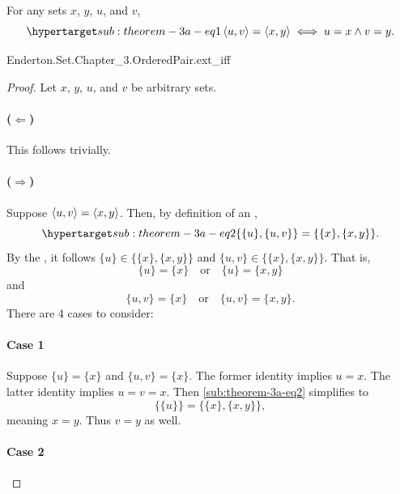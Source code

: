 \documentclass{report}
\begin{document}
  \begin{theorem}[3A]
    For any sets $x$, $y$, $u$, and $v$,
      \begin{equation}
        \hyperlabel{sub:theorem-3a-eq1}
        \tuple{u, v} = \tuple{x, y} \iff u = x \land v = y.
      \end{equation}
  \end{theorem}

    {Enderton.Set.Chapter\_3.OrderedPair.ext\_iff}

  \begin{proof}
    Let $x$, $y$, $u$, and $v$ be arbitrary sets.

    \paragraph{($\Leftarrow$)}%

      This follows trivially.

    \paragraph{($\Rightarrow$)}%

      Suppose $\left< u, v \right> = \left< x, y \right>$.
      Then, by definition of an ,
        \begin{equation}
          \hyperlabel{sub:theorem-3a-eq2}
          \{\{u\}, \{u, v\}\} = \{\{x\}, \{x, y\}\}.
        \end{equation}
      By the , it follows
        $\{u\} \in \{\{x\}, \{x, y\}\}$ and
        $\{u, v\} \in \{\{x\}, \{x, y\}\}$.
      That is,
        $$\{u\} = \{x\} \quad\text{or}\quad \{u\} = \{x, y\}$$
        and
        $$\{u, v\} = \{x\} \quad\text{or}\quad \{u, v\} = \{x, y\}.$$
      There are 4 cases to consider:

      \paragraph{Case 1}%

        Suppose $\{u\} = \{x\}$ and $\{u, v\} = \{x\}$.
        The former identity implies $u = x$.
        The latter identity implies $u = v = x$.
        Then \eqref{sub:theorem-3a-eq2} simplifies to
          $$\{\{u\}\} = \{\{x\}, \{x, y\}\},$$ meaning $x = y$.
        Thus $v = y$ as well.

      \paragraph{Case 2}%


\end{proof}
\end{document}

